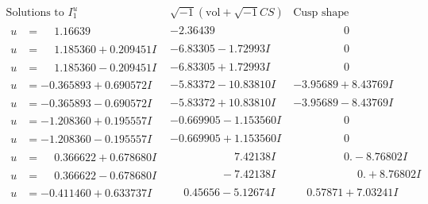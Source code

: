 \documentclass[1p]{elsarticle_modified}
\theoremstyle{definition}
\newcommand{\I}{\sqrt{-1}}
\begin{document}
$$\begin{array}{c|c|c}  
\text{Solutions to }I^u_{1}& \I (\text{vol} + \sqrt{-1}CS) & \text{Cusp shape}\\
 \hline 
\begin{aligned}
u &= \phantom{-}1.16639\phantom{ +0.000000I}\end{aligned}
 & -2.36439\phantom{ +0.000000I} & \phantom{-0.000000 } 0 \\ \hline\begin{aligned}
u &= \phantom{-}1.185360 + 0.209451 I\end{aligned}
 & -6.83305 - 1.72993 I & \phantom{-0.000000 } 0 \\ \hline\begin{aligned}
u &= \phantom{-}1.185360 - 0.209451 I\end{aligned}
 & -6.83305 + 1.72993 I & \phantom{-0.000000 } 0 \\ \hline\begin{aligned}
u &= -0.365893 + 0.690572 I\end{aligned}
 & -5.83372 - 10.83810 I & -3.95689 + 8.43769 I \\ \hline\begin{aligned}
u &= -0.365893 - 0.690572 I\end{aligned}
 & -5.83372 + 10.83810 I & -3.95689 - 8.43769 I \\ \hline\begin{aligned}
u &= -1.208360 + 0.195557 I\end{aligned}
 & -0.669905 - 1.153560 I & \phantom{-0.000000 } 0 \\ \hline\begin{aligned}
u &= -1.208360 - 0.195557 I\end{aligned}
 & -0.669905 + 1.153560 I & \phantom{-0.000000 } 0 \\ \hline\begin{aligned}
u &= \phantom{-}0.366622 + 0.678680 I\end{aligned}
 & \phantom{-0.000000 -}7.42138 I & \phantom{-0.000000 } 0. - 8.76802 I \\ \hline\begin{aligned}
u &= \phantom{-}0.366622 - 0.678680 I\end{aligned}
 & \phantom{-0.000000 } -7.42138 I & \phantom{-0.000000 -}0. + 8.76802 I \\ \hline\begin{aligned}
u &= -0.411460 + 0.633737 I\end{aligned}
 & \phantom{-}0.45656 - 5.12674 I & \phantom{-}0.57871 + 7.03241 I \\ \hline\begin{aligned}

\end{aligned}
\end{array}$$
\end{document}
